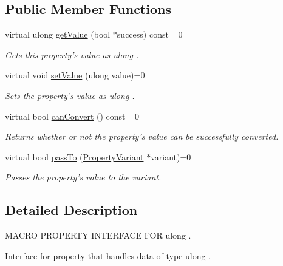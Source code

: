 \subsection*{Public Member Functions}
\begin{DoxyCompactItemize}
\item 
virtual ulong \hyperlink{class_i_u_long_property_a620e0d9b7260d93ee9e5a55c5c648f92}{get\-Value} (bool $\ast$success) const =0
\begin{DoxyCompactList}\small\item\em Gets this property's value as ulong . \end{DoxyCompactList}\item 
virtual void \hyperlink{class_i_u_long_property_a1a2b16105cd6cebdd7284ad6a631bfc4}{set\-Value} (ulong value)=0
\begin{DoxyCompactList}\small\item\em Sets the property's value as ulong . \end{DoxyCompactList}\item 
virtual bool \hyperlink{class_i_u_long_property_ad63c658df7494298fd8a0ab41623a184}{can\-Convert} () const =0
\begin{DoxyCompactList}\small\item\em Returns whether or not the property's value can be successfully converted. \end{DoxyCompactList}\item 
virtual bool \hyperlink{class_i_u_long_property_afa71d48192b5a4ef4ad94ed70be7029a}{pass\-To} (\hyperlink{class_property_variant}{Property\-Variant} $\ast$variant)=0
\begin{DoxyCompactList}\small\item\em Passes the property's value to the variant. \end{DoxyCompactList}\end{DoxyCompactItemize}


\subsection{Detailed Description}
M\-A\-C\-R\-O P\-R\-O\-P\-E\-R\-T\-Y I\-N\-T\-E\-R\-F\-A\-C\-E F\-O\-R ulong . 

Interface for property that handles data of type ulong . 

